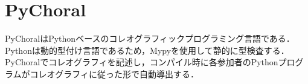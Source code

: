 \documentclass{resume}
\begin{document}
%
\section{PyChoral}

PyChoralはPythonベースのコレオグラフィックプログラミング言語である．
Pythonは動的型付け言語であるため，Mypyを使用して静的に型検査する．
PyChoralでコレオグラフィを記述し，コンパイル時に各参加者のPythonプログラムがコレオグラフィに従った形で自動導出する．
\end{document}
